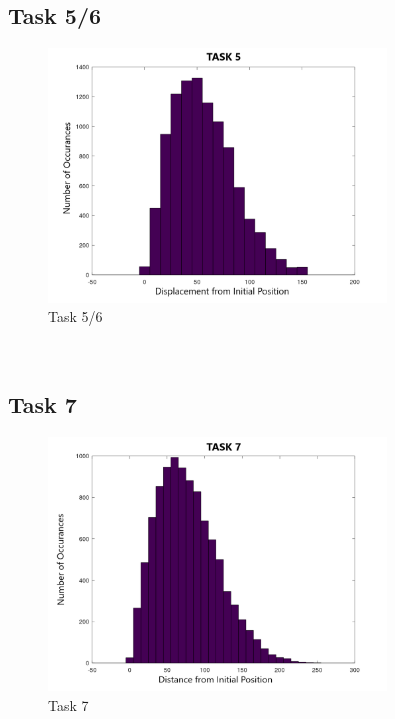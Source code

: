 \documentclass[answers]{exam}
\begin{document}
\subsection{Task 5/6}
    \begin{figure}[H]
        \centering
        \includegraphics[width = 0.8\textwidth]{Graphs/task5.png}
        \caption{Task 5/6}
        \label{fig:task5}
    \end{figure}\\
    
\subsection{Task 7}
    \begin{figure}[H]
        \centering
        \includegraphics[width = 0.8\textwidth]{Graphs/task7.png}
        \caption{Task 7}
        \label{fig:task7}
    \end{figure}\\
    
\end{document}
